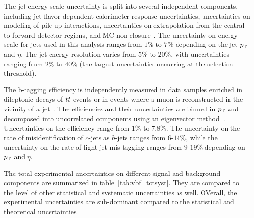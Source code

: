 The jet energy scale uncertainty is split into several independent components, including jet-flavor dependent calorimeter response uncertainties, uncertainties on modeling of pile-up interactions, uncertainties on extrapolation from the central to forward detector regions, and MC non-closure~\cite{atlas_jets}. The uncertainty on energy scale for jets used in this analysis ranges from $1\%$ to $7\%$ depending on the jet $p_{\textrm{\footnotesize\sc t}}$ and $\eta$. The jet energy resolution varies from $5\%$ to $20\%$, with uncertainties ranging from $2\%$ to $40\%$ (the largest uncertainties occurring at the selection threshold).

The b-tagging efficiency is independently measured in data samples enriched in dileptonic decays of $t\bar{t}$ events or in events where a muon is reconstructed in the vicinity of a jet~\cite{btag-calib,btag-muons}. The efficiencies and their uncertainties are binned in $p_{\textrm{\footnotesize\sc t}}$ and decomposed into uncorrelated components using an eigenvector method~\cite{BtagCalib1}. Uncertainties on the efficiency range from $1\%$ to $7.8\%$. The uncertainty on the rate of misidentification of $c$-jets as $b$-jets ranges from $6$-$14$\%, while the uncertainty on the rate of light jet mis-tagging ranges from $9$-$19\%$ depending on $p_{\textrm{\footnotesize\sc t}}$ and $\eta$.

The total experimental uncertainties on different signal and background components are summarized in table~\ref{tab:vbf_totsyst}. They are compared to the level of other statistical and systematic uncertainties as well. OVerall, the experimental uncertainties are sub-dominant compared to the statistical and theoretical uncertainties.

